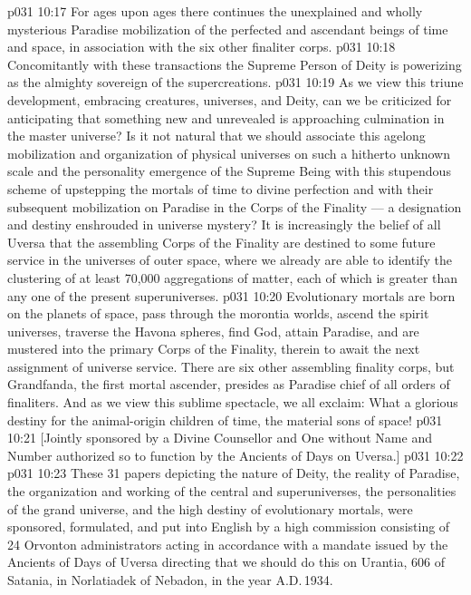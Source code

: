 \vs p031 10:17 \bibnobreakspace For ages upon ages there continues the unexplained and wholly mysterious Paradise mobilization of the perfected and ascendant beings of time and space, in association with the six other finaliter corps.
\vs p031 10:18 \bibnobreakspace Concomitantly with these transactions the Supreme Person of Deity is powerizing as the almighty sovereign of the supercreations.
\vs p031 10:19 \pc As we view this triune development, embracing creatures, universes, and Deity, can we be criticized for anticipating that something new and unrevealed is approaching culmination in the master universe? Is it not natural that we should associate this agelong mobilization and organization of physical universes on such a hitherto unknown scale and the personality emergence of the Supreme Being with this stupendous scheme of upstepping the mortals of time to divine perfection and with their subsequent mobilization on Paradise in the Corps of the Finality --- a designation and destiny enshrouded in universe mystery? It is increasingly the belief of all Uversa that the assembling Corps of the Finality are destined to some future service in the universes of outer space, where we already are able to identify the clustering of at least 70,000 aggregations of matter, each of which is greater than any one of the present superuniverses.
\vs p031 10:20 \pc Evolutionary mortals are born on the planets of space, pass through the morontia worlds, ascend the spirit universes, traverse the Havona spheres, find God, attain Paradise, and are mustered into the primary Corps of the Finality, therein to await the next assignment of universe service. There are six other assembling finality corps, but Grandfanda, the first mortal ascender, presides as Paradise chief of all orders of finaliters. And as we view this sublime spectacle, we all exclaim: What a glorious destiny for the animal\hyp{}origin children of time, the material sons of space!
\vsetoff
\vs p031 10:21 [Jointly sponsored by a Divine Counsellor and One without Name and Number authorized so to function by the Ancients of Days on Uversa.]
\vs p031 10:22 \separatorline
\vs p031 10:23 These 31 papers depicting the nature of Deity, the reality of Paradise, the organization and working of the central and superuniverses, the personalities of the grand universe, and the high destiny of evolutionary mortals, were sponsored, formulated, and put into English by a high commission consisting of 24 Orvonton administrators acting in accordance with a mandate issued by the Ancients of Days of Uversa directing that we should do this on Urantia, 606 of Satania, in Norlatiadek of Nebadon, in the year A.D.\,1934.
\quizlink
